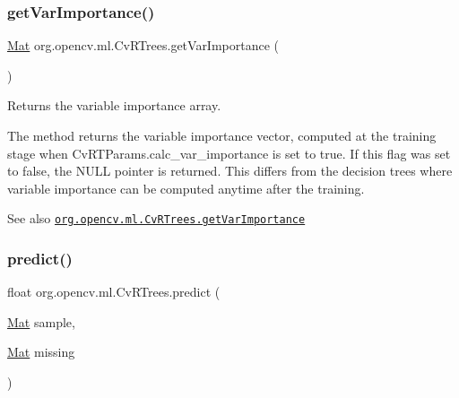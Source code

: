 \mbox{\label{classorg_1_1opencv_1_1ml_1_1_cv_r_trees_a509bd837e63864c7006cd17765f97912}} 
\subsubsection{\texorpdfstring{get\+Var\+Importance()}{getVarImportance()}}
{\footnotesize\ttfamily \mbox{\hyperlink{classorg_1_1opencv_1_1core_1_1_mat}{Mat}} org.\+opencv.\+ml.\+Cv\+R\+Trees.\+get\+Var\+Importance (\begin{DoxyParamCaption}{ }\end{DoxyParamCaption})}

Returns the variable importance array.

The method returns the variable importance vector, computed at the training stage when {\ttfamily Cv\+R\+T\+Params.\+calc\+\_\+var\+\_\+importance} is set to true. If this flag was set to false, the {\ttfamily N\+U\+LL} pointer is returned. This differs from the decision trees where variable importance can be computed anytime after the training.

\begin{DoxySeeAlso}{See also}
\href{http://docs.opencv.org/modules/ml/doc/random_trees.html#cvrtrees-getvarimportance}{\tt org.\+opencv.\+ml.\+Cv\+R\+Trees.\+get\+Var\+Importance} 
\end{DoxySeeAlso}
\mbox{\label{classorg_1_1opencv_1_1ml_1_1_cv_r_trees_a3c383d14585b25b186ceb69e160a1511}} 
\subsubsection{\texorpdfstring{predict()}{predict()}\hspace{0.1cm}{\footnotesize\ttfamily [1/2]}}
{\footnotesize\ttfamily float org.\+opencv.\+ml.\+Cv\+R\+Trees.\+predict (\begin{DoxyParamCaption}\item[{\mbox{\hyperlink{classorg_1_1opencv_1_1core_1_1_mat}{Mat}}}]{sample,  }\item[{\mbox{\hyperlink{classorg_1_1opencv_1_1core_1_1_mat}{Mat}}}]{missing }\end{DoxyParamCaption})}

